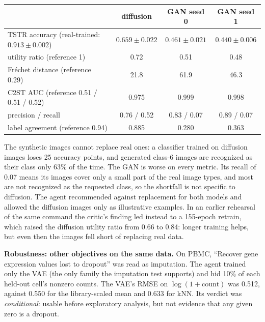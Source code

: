 \documentclass[10pt]{article}
\begin{document}
\begin{center}\small
\begin{tabular}{lccc}
\toprule
 & diffusion & GAN seed 0 & GAN seed 1\\
\midrule
TSTR accuracy (real-trained: $0.913 \pm 0.002$) & $0.659 \pm 0.022$ & $0.461 \pm 0.021$ & $0.440 \pm 0.006$\\
utility ratio (reference 1) & 0.72 & 0.51 & 0.48\\
Fr\'echet distance (reference 0.29) & 21.8 & 61.9 & 46.3\\
C2ST AUC (reference 0.51 / 0.51 / 0.52) & 0.975 & 0.999 & 0.998\\
precision / recall & 0.76 / 0.52 & 0.83 / 0.07 & 0.89 / 0.07\\
label agreement (reference 0.94) & 0.885 & 0.280 & 0.363\\
\bottomrule
\end{tabular}
\end{center}

The synthetic images cannot replace real ones: a classifier trained on diffusion images loses 25 accuracy points, and
generated class-6 images are recognized as their class only 63\% of the time. The GAN is worse on every metric. Its
recall of 0.07 means its images cover only a small part of the real image types, and most are not recognized as the
requested class, so the shortfall is not specific to diffusion. The agent recommended against replacement for both
models and allowed the diffusion images only as illustrative examples. In an earlier rehearsal of the same command the
critic's finding led instead to a 155-epoch retrain, which raised the diffusion utility ratio from 0.66 to 0.84: longer
training helps, but even then the images fell short of replacing real data.

\textbf{Robustness: other objectives on the same data.} On PBMC, ``Recover gene expression values lost to dropout'' was
read as imputation. The agent trained only the VAE (the only family the imputation test supports) and hid 10\% of each
held-out cell's nonzero counts. The VAE's RMSE on $\log(1+\text{count})$ was 0.512, against 0.550 for the
library-scaled mean and 0.633 for kNN. Its verdict was \emph{conditional}: usable before exploratory analysis, but not
evidence that any given zero is a dropout.
\end{document}
